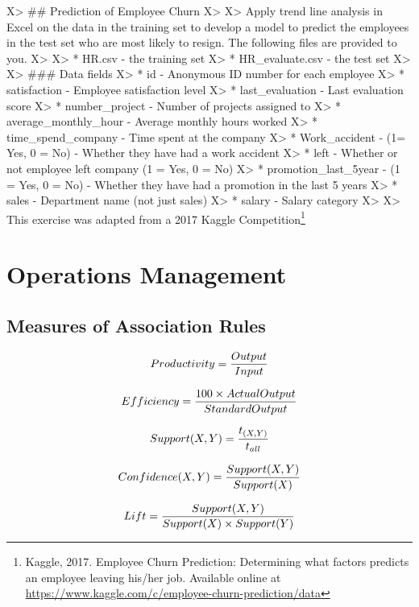 \documentclass[]{book}
\let\rmarkdownfootnote\footnote%
\def\footnote{\protect\rmarkdownfootnote}
\begin{document}
X\textgreater{} \#\# Prediction of Employee Churn
X\textgreater{}
X\textgreater{} Apply trend line analysis in Excel on the data in the training set to develop a model to predict the employees in the test set who are most likely to resign. The following files are provided to you.
X\textgreater{}
X\textgreater{} * HR.csv - the training set
X\textgreater{} * HR\_evaluate.csv - the test set
X\textgreater{}
X\textgreater{} \#\#\# Data fields
X\textgreater{} * id - Anonymous ID number for each employee
X\textgreater{} * satisfaction - Employee satisfaction level
X\textgreater{} * last\_evaluation - Last evaluation score
X\textgreater{} * number\_project - Number of projects assigned to
X\textgreater{} * average\_monthly\_hour - Average monthly hours worked
X\textgreater{} * time\_spend\_company - Time spent at the company
X\textgreater{} * Work\_accident - (1= Yes, 0 = No) - Whether they have had a work accident
X\textgreater{} * left - Whether or not employee left company (1 = Yes, 0 = No)
X\textgreater{} * promotion\_last\_5year - (1 = Yes, 0 = No) - Whether they have had a promotion in the last 5 years
X\textgreater{} * sales - Department name (not just sales)
X\textgreater{} * salary - Salary category
X\textgreater{}
X\textgreater{} This exercise was adapted from a 2017 Kaggle Competition\footnote{Kaggle, 2017. Employee Churn Prediction: Determining what factors predicts an employee leaving his/her job. Available online at \url{https://www.kaggle.com/c/employee-churn-prediction/data}}

\hypertarget{operations-management}{%
\chapter{Operations Management}\label{operations-management}}

\hypertarget{measures-of-association-rules}{%
\section{Measures of Association Rules}\label{measures-of-association-rules}}

\[Productivity = {Output \over Input} \]

\[Efficiency = {100 \times ActualOutput \over StandardOutput}\]

\[Support(X,Y) = {t_{(X,Y)}\over t_{all}}\]

\[Confidence(X,Y) = {Support(X,Y)\over Support(X)} \]

\[Lift = {Support(X,Y) \over Support(X) \times Support(Y)}\]
\end{document}
